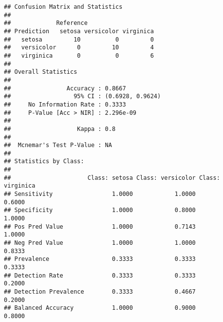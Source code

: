 \documentclass[]{article}
\begin{document}
\begin{verbatim}
## Confusion Matrix and Statistics
## 
##             Reference
## Prediction   setosa versicolor virginica
##   setosa         10          0         0
##   versicolor      0         10         4
##   virginica       0          0         6
## 
## Overall Statistics
##                                           
##                Accuracy : 0.8667          
##                  95% CI : (0.6928, 0.9624)
##     No Information Rate : 0.3333          
##     P-Value [Acc > NIR] : 2.296e-09       
##                                           
##                   Kappa : 0.8             
##                                           
##  Mcnemar's Test P-Value : NA              
## 
## Statistics by Class:
## 
##                      Class: setosa Class: versicolor Class: virginica
## Sensitivity                 1.0000            1.0000           0.6000
## Specificity                 1.0000            0.8000           1.0000
## Pos Pred Value              1.0000            0.7143           1.0000
## Neg Pred Value              1.0000            1.0000           0.8333
## Prevalence                  0.3333            0.3333           0.3333
## Detection Rate              0.3333            0.3333           0.2000
## Detection Prevalence        0.3333            0.4667           0.2000
## Balanced Accuracy           1.0000            0.9000           0.8000
\end{verbatim}
\end{document}
